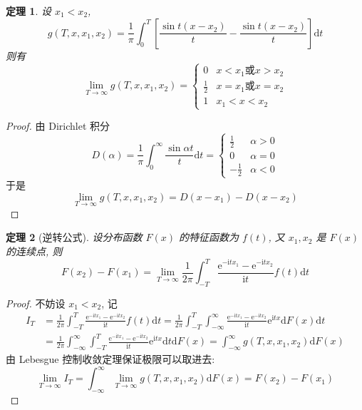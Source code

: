 \documentclass[12pt,a4paper]{article}
\newtheorem{thm}{定理}[subsection]  %
\begin{document}
\begin{thm}
    设 $x_1<x_2$, \[g(T, x, x_1, x_2) = \frac{1}{\pi} \int_0^T \left[ \frac{\sin t(x - x_2)}{t} - \frac{\sin t(x - x_2)}{t} \right] \mathrm{d} t\]
    则有 \[ \lim_{T \to \infty} g(T, x, x_1, x_2) = \begin{cases}0 & x<x_1 \text{或} x>x_2  \\ \frac{1}{2}  & x=x_1 \text{或} x = x_2 \\ 1 & x_1<x<x_2 \end{cases}\]
\end{thm}

\begin{proof}
    由 Dirichlet 积分
    \[D(\alpha) = \frac{1}{\pi} \int_{0}^{\infty} \frac{\sin \alpha t}{t} \mathrm{d}t = \begin{cases} \frac{1}{2} & \alpha > 0 \\ 0 & \alpha = 0 \\ - \frac{1}{2} & \alpha<0 \end{cases}\]
    于是 \[\lim_{T \to \infty} g(T, x, x_1, x_2) = D(x-x_1) - D(x-x_2)\]
\end{proof}

\begin{thm}[逆转公式]
    设分布函数 $F(x)$ 的特征函数为 $f(t)$, 又 $x_1, x_2$ 是 $F(x)$ 的连续点, 则 
    \[F(x_2) - F(x_1) = \lim_{T \to \infty} \frac{1}{2\pi} \int_{-T}^{T} \frac{\mathrm{e}^{-\mathrm{i}tx_1} - \mathrm{e}^{-\mathrm{i}tx_2}}{\mathrm{i}t} f(t) \mathrm{d} t\]
\end{thm}

\begin{proof}
    不妨设 $x_1<x_2$, 记 
    \[\begin{aligned}
        I_T & = \frac{1}{2\pi} \int_{-T}^{T} \frac{\mathrm{e}^{-\mathrm{i}tx_1} - \mathrm{e}^{-\mathrm{i}tx_2}}{\mathrm{i}t} f(t) \mathrm{d} t
    = \frac{1}{2\pi} \int_{-T}^{T} \int_{-\infty}^{\infty} \frac{\mathrm{e}^{-\mathrm{i}tx_1} - \mathrm{e}^{-\mathrm{i}tx_2}}{\mathrm{i}t} \mathrm{e}^{\mathrm{i}tx} \mathrm{d} F(x) \mathrm{d}t\\
    & = \frac{1}{2\pi} \int_{-\infty}^{\infty} \int_{-T}^{T} \frac{\mathrm{e}^{-\mathrm{i}tx_1} - \mathrm{e}^{-\mathrm{i}tx_2}}{\mathrm{i}t} \mathrm{e}^{\mathrm{i}tx} \mathrm{d} t \mathrm{d} F(x)
    = \int_{-\infty}^{\infty} g(T, x, x_1, x_2) \mathrm{d} F(x)
    \end{aligned}\]
    由 Lebesgue 控制收敛定理保证极限可以取进去:
    \[\lim_{T \to \infty} I_T = \int_{-\infty}^{\infty} \lim_{T \to \infty} g(T, x, x_1, x_2) \mathrm{d} F(x) = F(x_2) - F(x_1)\]
\end{proof}
\end{document}

